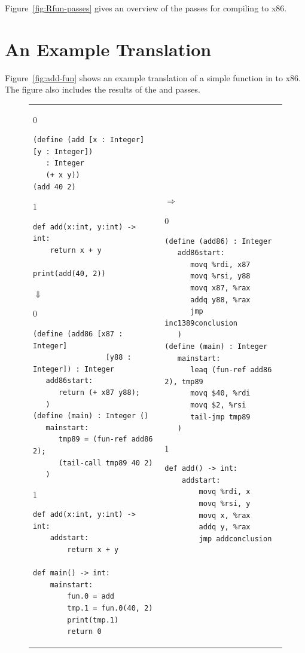 \documentclass[7x10,nocrop]{TimesAPriori_MIT}%
\def\racketEd{0}
\def\pythonEd{1}
\def\edition{0}
\begin{document}
Figure~\ref{fig:Rfun-passes} gives an overview of the passes for
compiling \LangFun{} to x86.

\section{An Example Translation}
\label{sec:functions-example}

Figure~\ref{fig:add-fun} shows an example translation of a simple
function in \LangFun{} to x86. The figure also includes the results of the
 and  passes.

\begin{figure}[htbp]
\begin{tabular}{ll}
\begin{minipage}{0.4\textwidth}
{\if\edition\racketEd
\begin{lstlisting}[basicstyle=\ttfamily\footnotesize]
(define (add [x : Integer] [y : Integer])
   : Integer
   (+ x y))
(add 40 2)
\end{lstlisting}
\fi}
{\if\edition\pythonEd
\begin{lstlisting}[basicstyle=\ttfamily\footnotesize]
def add(x:int, y:int) -> int:
    return x + y

print(add(40, 2))
\end{lstlisting}
\fi}
$\Downarrow$
{\if\edition\racketEd
\begin{lstlisting}[basicstyle=\ttfamily\footnotesize]
(define (add86 [x87 : Integer]
                 [y88 : Integer]) : Integer
   add86start:
      return (+ x87 y88);
   )
(define (main) : Integer ()
   mainstart:
      tmp89 = (fun-ref add86 2);
      (tail-call tmp89 40 2)
   )
\end{lstlisting}
\fi}
{\if\edition\pythonEd
\begin{lstlisting}[basicstyle=\ttfamily\footnotesize]
def add(x:int, y:int) -> int:
    addstart:
        return x + y

def main() -> int:
    mainstart:
        fun.0 = add
        tmp.1 = fun.0(40, 2)
        print(tmp.1)
        return 0
\end{lstlisting}
\fi}
\end{minipage}
&
$\Rightarrow$
\begin{minipage}{0.5\textwidth}
{\if\edition\racketEd
\begin{lstlisting}[basicstyle=\ttfamily\footnotesize]
(define (add86) : Integer
   add86start:
      movq %rdi, x87
      movq %rsi, y88
      movq x87, %rax
      addq y88, %rax
      jmp inc1389conclusion
   )
(define (main) : Integer
   mainstart:
      leaq (fun-ref add86 2), tmp89
      movq $40, %rdi
      movq $2, %rsi
      tail-jmp tmp89
   )
\end{lstlisting}
\fi}
{\if\edition\pythonEd
\begin{lstlisting}[basicstyle=\ttfamily\footnotesize]
def add() -> int:
    addstart:
        movq %rdi, x
        movq %rsi, y
        movq x, %rax
        addq y, %rax
        jmp addconclusion


\end{lstlisting}}
\end{minipage}
\end{tabular}
\end{figure}
\end{document}
